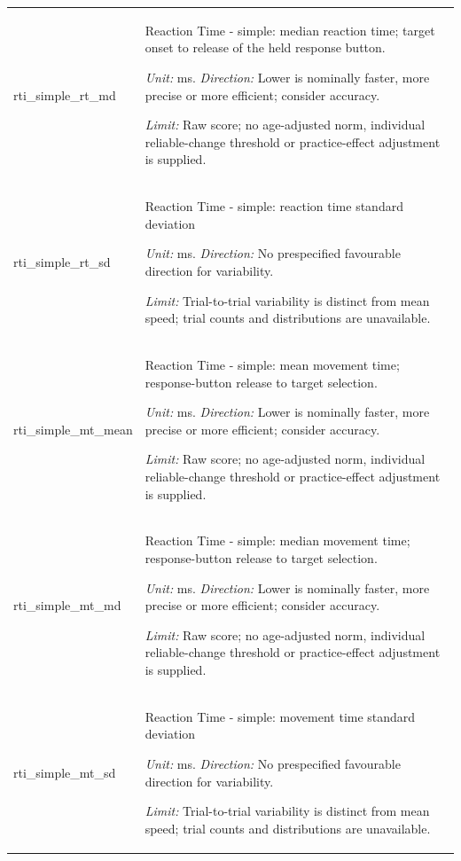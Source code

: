 \begin{longtable}{p{.26\linewidth}p{.66\linewidth}}
{\ttfamily\footnotesize rti\_\allowbreak{}simple\_\allowbreak{}rt\_\allowbreak{}md} & Reaction Time - simple: median reaction time; target onset to release of the held response button.\par\textit{Unit:} ms. \textit{Direction:} Lower is nominally faster, more precise or more efficient; consider accuracy.\par\textit{Limit:} Raw score; no age-adjusted norm, individual reliable-change threshold or practice-effect adjustment is supplied. \\[7pt]
{\ttfamily\footnotesize rti\_\allowbreak{}simple\_\allowbreak{}rt\_\allowbreak{}sd} & Reaction Time - simple: reaction time standard deviation\par\textit{Unit:} ms. \textit{Direction:} No prespecified favourable direction for variability.\par\textit{Limit:} Trial-to-trial variability is distinct from mean speed; trial counts and distributions are unavailable. \\[7pt]
{\ttfamily\footnotesize rti\_\allowbreak{}simple\_\allowbreak{}mt\_\allowbreak{}mean} & Reaction Time - simple: mean movement time; response-button release to target selection.\par\textit{Unit:} ms. \textit{Direction:} Lower is nominally faster, more precise or more efficient; consider accuracy.\par\textit{Limit:} Raw score; no age-adjusted norm, individual reliable-change threshold or practice-effect adjustment is supplied. \\[7pt]
{\ttfamily\footnotesize rti\_\allowbreak{}simple\_\allowbreak{}mt\_\allowbreak{}md} & Reaction Time - simple: median movement time; response-button release to target selection.\par\textit{Unit:} ms. \textit{Direction:} Lower is nominally faster, more precise or more efficient; consider accuracy.\par\textit{Limit:} Raw score; no age-adjusted norm, individual reliable-change threshold or practice-effect adjustment is supplied. \\[7pt]
{\ttfamily\footnotesize rti\_\allowbreak{}simple\_\allowbreak{}mt\_\allowbreak{}sd} & Reaction Time - simple: movement time standard deviation\par\textit{Unit:} ms. \textit{Direction:} No prespecified favourable direction for variability.\par\textit{Limit:} Trial-to-trial variability is distinct from mean speed; trial counts and distributions are unavailable. \\[7pt]

\end{longtable}
